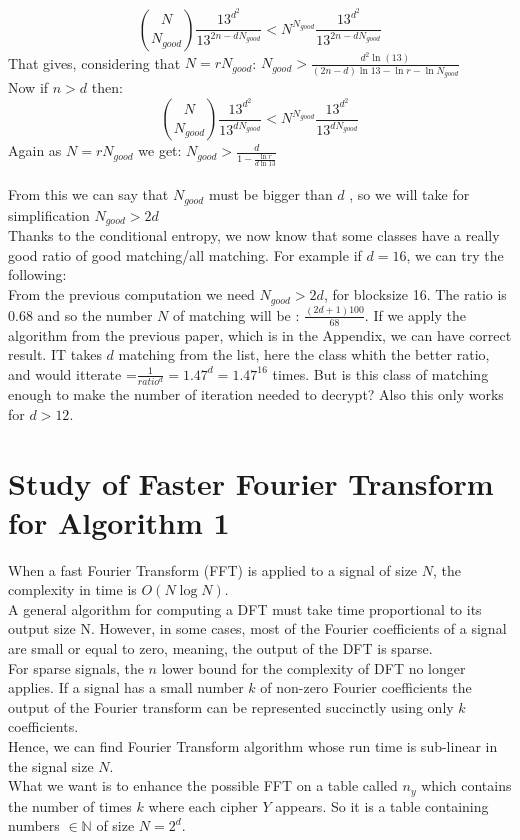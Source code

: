 \documentclass{article}
\begin{document}
$${N \choose N_{good}} \frac{13^{d^{2}}}{13^{2n-d N_{good}}} <  N^{N_{good}} \frac{13^{d^{2}}}{13^{2n-d N_{good}}}$$
That gives, considering that $N = r N_{good}$: $N_{good} > \frac{d^{2} \ln(13)}{(2n-d)\ln 13 - \ln r - \ln N_{good}}$\\
Now if $n>d$ then: 
$${N \choose N_{good}} \frac{13^{d^{2}}}{13^{d N_{good}}} <  N^{N_{good}} \frac{13^{d^{2}}}{13^{d N_{good}}}$$
Again as $N = r N_{good}$ we get: $N_{good} > \frac{d}{1-\frac{\ln r}{d \ln 13}}$\\
\\
From this we can say that $N_{good}$ must be bigger than $d$ , so we will take for simplification $N_{good} > 2d$\\

Thanks to the conditional entropy, we now know that some classes have a really good ratio of good matching/all matching. For example if $d=16$, we can try the following:\\ 
From the previous computation we need $N_{good} > 2d $, for blocksize 16. The ratio is 0.68 and so the number $N$ of matching will be : $ \frac{(2d+1)100}{68}$. If we apply the algorithm from the previous paper, which is in the Appendix, we can have correct result. IT takes $d$ matching from the list, here the class whith the better ratio, and would itterate =$\frac{1}{ratio^d} = 1.47^d = 1.47^{16}$ times. But is this class of matching enough to make the number of iteration needed to decrypt? Also this only works for $d>12$.



\section{Study of Faster Fourier Transform for Algorithm 1}
When a fast Fourier Transform (FFT) is applied to a signal of size $N$, the complexity in time is $O(N\log N)$.\\
A general algorithm for computing a DFT must take time proportional to its output size N. However, in some cases, most of the Fourier coefficients of a signal are small or equal to zero, meaning, the output of the DFT is sparse.\\
For sparse signals, the $n$ lower bound for the complexity of DFT no longer applies. If a signal has a small number $k$ of non-zero Fourier coefficients the output of the Fourier transform can be represented succinctly using only $k$ coefficients.\\
Hence, we can find Fourier Transform algorithm whose run time is sub-linear in the signal size $N$.\\
What we want is to enhance the possible FFT on a table called $n_y$ which contains the number of times $k$ where each cipher $Y$ appears. So it is a table containing numbers $\in \mathbb{N}$ of size $N=2^d$.\\
\end{document}
